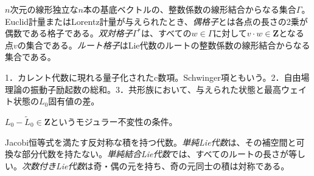 {$n$次元の線形独立な$n$本の基底ベクトルの、整数係数の線形結合からなる集合$\Gamma$。Euclid計量またはLorentz計量が与えられたとき、\emph{偶格子}とは各点の長さの2乗が偶数である格子である。\emph{双対格子}$\Gamma^*$は、すべての$w\in\Gamma$に対して$v\cdot w\in\mathbf Z$となる点$v$の集合である。\emph{ルート格子}はLie代数のルートの整数係数の線形結合からなる集合である。}

{1．カレント代数に現れる量子化されたc数項。Schwinger項ともいう。2．自由場理論の振動子励起数の総和。3．共形族において、与えられた状態と最高ウェイト状態の$L_0$固有値の差。}

{$L_0-\widetilde L_0\in\mathbf Z$というモジュラー不変性の条件。}

{Jacobi恒等式を満たす反対称な積を持つ代数。\emph{単純Lie代数}は、その補空間と可換な部分代数を持たない。\emph{単純結合Lie代数}では、すべてのルートの長さが等しい。\emph{次数付きLie代数}は奇・偶の元を持ち、奇の元同士の積は対称である。}

